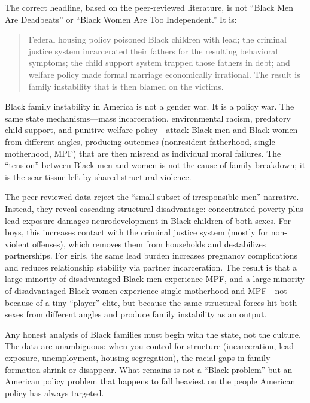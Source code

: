 The correct headline, based on the peer-reviewed literature, is not ``Black Men Are Deadbeats'' or ``Black Women Are Too Independent.'' It is:

\begin{quote}
Federal housing policy poisoned Black children with lead; the criminal justice system incarcerated their fathers for the resulting behavioral symptoms; the child support system trapped those fathers in debt; and welfare policy made formal marriage economically irrational. The result is family instability that is then blamed on the victims.
\end{quote}

Black family instability in America is not a gender war. It is a policy war. The same state mechanisms---mass incarceration, environmental racism, predatory child support, and punitive welfare policy---attack Black men and Black women from different angles, producing outcomes (nonresident fatherhood, single motherhood, MPF) that are then misread as individual moral failures. The ``tension'' between Black men and women is not the cause of family breakdown; it is the scar tissue left by shared structural violence.

The peer-reviewed data reject the ``small subset of irresponsible men'' narrative. Instead, they reveal cascading structural disadvantage: concentrated poverty plus lead exposure damages neurodevelopment in Black children of both sexes. For boys, this increases contact with the criminal justice system (mostly for non-violent offenses), which removes them from households and destabilizes partnerships. For girls, the same lead burden increases pregnancy complications and reduces relationship stability via partner incarceration. The result is that a large minority of disadvantaged Black men experience MPF, and a large minority of disadvantaged Black women experience single motherhood and MPF---not because of a tiny ``player'' elite, but because the same structural forces hit both sexes from different angles and produce family instability as an output.

Any honest analysis of Black families must begin with the state, not the culture. The data are unambiguous: when you control for structure (incarceration, lead exposure, unemployment, housing segregation), the racial gaps in family formation shrink or disappear. What remains is not a ``Black problem'' but an American policy problem that happens to fall heaviest on the people American policy has always targeted.
